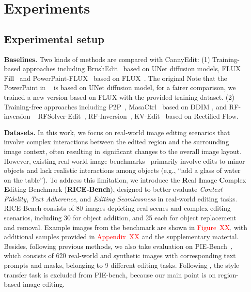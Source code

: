 \documentclass{article}
\begin{document}
\section{Experiments}
\label{Sec:experiment}


\subsection{Experimental setup}

\textbf{Baselines.} Two kinds of methods are compared with CannyEdit: (1) Training-based approaches including BrushEdit~\cite{li2024brushedit} based on UNet diffusion models, FLUX Fill~\cite{blackforest2024FLUX} and PowerPaint-FLUX~\cite{zhuang2023task} based on FLUX~\cite{blackforest2024FLUX}. The original Note that the PowerPaint in ~\cite{blackforest2024FLUX} is based on UNet diffusion model, for a fairer comparison, we trained a new version based on FLUX with the provided training dataset. (2) Training-free approaches including P2P~\cite{hertz2022prompt}, MasaCtrl~\cite{cao2023masactrl} based on DDIM \citep{song2022denoisingdiffusionimplicitmodels}, and RF-inversion ~\cite{wang2024taming} RFSolver-Edit~\cite{wang2024taming}, RF-Inversion~\cite{rout2024semantic}, KV-Edit~\cite{zhu2025kv} based on Rectified
Flow. %

\textbf{Datasets.} In this work, we focus on real-world image editing scenarios that involve complex interactions between the edited region and the surrounding image context, often resulting in significant changes to the overall image layout. However, existing real-world image benchmarks~\citep{sheynin2024emu,gu2024multi} primarily involve edits to minor objects and lack realistic interactions among objects (e.g., ``add a glass of water on the table''). To address this limitation, we introduce the \textbf{R}eal \textbf{I}mage \textbf{C}omplex \textbf{E}diting Benchmark (\textbf{RICE-Bench}), designed to better evaluate \textit{Context Fidelity}, \textit{Text Adherence}, and \textit{Editing Seamlessness} in real-world editing tasks. RICE-Bench consists of 80 images depicting real scenes and complex editing scenarios, including 30 for object addition, and 25 each for object replacement and removal. Example images from the benchmark are shown in \textcolor{red}{Figure~XX}, with additional samples provided in \textcolor{red}{Appendix~XX} and the supplementary material. Besides, following previous methods, we also take evaluation on PIE-Bench~\cite{ju2024pnp}, which consists of 620 real-world and synthetic images with corresponding text prompts and masks, belonging to 9 different editing tasks. Following \cite{li2024brushedit, xu2023infedit, zhu2025kv}, the style transfer task is excluded from PIE-bench, because our main point is on region-based image editing.
\end{document}
